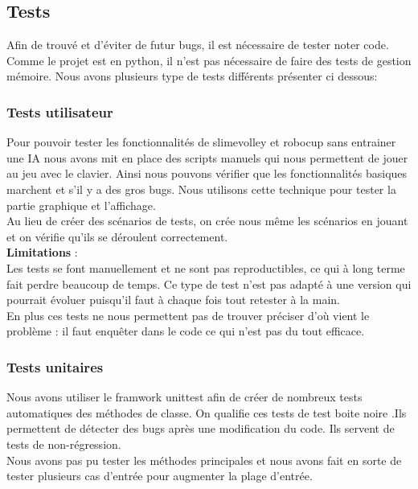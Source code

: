 \documentclass[11pt, a4paper]{article}
\begin{document}
	\subsection{Tests}

	Afin de trouvé et d'éviter de futur bugs, il est nécessaire de tester noter code. Comme le projet est en python,
	il n'est pas nécessaire de faire des tests de gestion mémoire.
	Nous avons plusieurs type de tests différents présenter ci dessous:

	\subsubsection{Tests utilisateur}

	Pour pouvoir tester les fonctionnalités de slimevolley et robocup sans entrainer une IA nous avons mit en place des scripts manuels qui nous permettent de jouer au jeu avec le clavier. Ainsi nous pouvons vérifier que les fonctionnalités basiques marchent et s'il y a des gros bugs. Nous utilisons cette technique pour tester la partie graphique et l'affichage.\\
	Au lieu de créer des scénarios de tests, on crée nous même les scénarios en jouant et on vérifie qu'ils se déroulent correctement.\\

	\noindent \textbf{Limitations }: \\
	Les tests se font manuellement et ne sont pas reproductibles, ce qui à long terme fait perdre beaucoup de temps. Ce type de test n'est pas adapté à une version qui pourrait évoluer puisqu'il faut à chaque fois tout retester à la main.\\
	En plus ces tests ne nous permettent pas de trouver préciser d'où vient le problème : il faut enquêter dans le code ce qui n'est pas du tout efficace.


	\subsubsection{Tests unitaires}

	Nous avons utiliser le framwork unittest afin de créer de nombreux tests automatiques des
	méthodes de classe. On qualifie ces tests de test boite noire .Ils permettent de détecter des bugs après une modification du code. Ils servent de tests de non-régression.\\

	Nous avons pas pu tester les méthodes principales et nous avons fait en sorte de tester plusieurs cas d'entrée pour augmenter la plage d'entrée.\\
\end{document}
